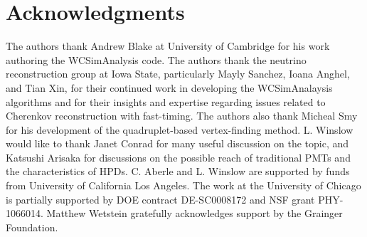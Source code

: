 \documentclass[aps,prc,twocolumn,groupedaddress,showpacs,amsmath,amssymb,floatfix,superscriptaddress]{revtex4}
\begin{document}
\section{Acknowledgments}
The authors thank Andrew Blake at University of Cambridge for his work
authoring the WCSimAnalysis code. The authors thank the neutrino
reconstruction group at Iowa State, particularly Mayly Sanchez, Ioana
Anghel, and Tian Xin, for their continued work in developing the
WCSimAnalaysis algorithms and for their insights and expertise
regarding issues related to Cherenkov reconstruction with
fast-timing. The authors also thank Micheal Smy for his development of
the quadruplet-based vertex-finding method. L. Winslow would like to
thank Janet Conrad for many useful discussion on the topic, and
Katsushi Arisaka for discussions on the possible reach of traditional PMTs
and the characteristics of HPDs. C. Aberle and L. Winslow are
supported by funds from University of California Los Angeles. The work
at the University of Chicago is partially supported by DOE
contract DE-SC0008172 and NSF grant PHY-1066014. Matthew Wetstein gratefully
acknowledges support by the Grainger Foundation.

 
\end{document}
